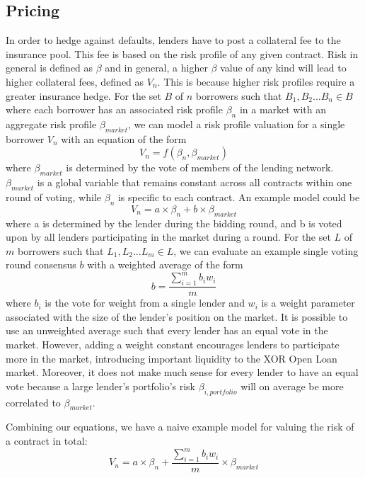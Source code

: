 \documentclass[twoside]{article}
\begin{document}
\subsection{Pricing}
In order to hedge against defaults, lenders have to post a collateral fee to the insurance pool. This fee is based on the risk profile of any given contract. Risk in general is defined as $\beta$ and in general, a higher $\beta$ value of any kind will lead to higher collateral fees, defined as $V_{n}$. This is because higher risk profiles require a greater insurance hedge. For the set $B$  of $n$ borrowers such that $B_{1}, B_{2}...B_{n} \in B$ where each borrower has an associated risk profile $\beta_{n}$ in a market with an aggregate risk profile $\beta_{market}$, we can model a risk profile valuation for a single borrower $V_{n}$ with an equation of the form
\begin{equation}
V_{n} = f(\beta_{n}, \beta_{market})
\end{equation}
where $\beta_{market}$ is determined by the vote of members of the lending network. $\beta_{market}$ is a global variable that remains constant across all contracts within one round of voting, while $\beta_{n}$ is specific to each contract. An example model could be
\begin{equation}
V_{n} = a\times \beta_{n} + b\times \beta_{market}
\end{equation}
where a is determined by the lender during the bidding round, and b is voted upon by all lenders participating in the market during a round. For the set $L$ of $m$ borrowers such that $L_{1}, L_{2}...L_{m} \in L$, we can evaluate an example single voting round consensus $b$ with a weighted average of the form
\begin{equation}
b = \frac{\sum\limits_{i=1}^m b_{i} w_{i}}{m}
\end{equation}
where $b_{i}$ is the vote for weight from a single lender and $w_{i}$ is a weight parameter associated with the size of the lender's position on the market. It is possible to use an unweighted average such that every lender has an equal vote in the market. However, adding a weight constant encourages lenders to participate more in the market, introducing important liquidity to the XOR Open Loan market. Moreover, it does not make much sense for every lender to have an equal vote because a large lender's portfolio's risk $\beta_{i,portfolio}$ will on average be more correlated to $\beta_{market}$. 

Combining our equations, we have a naive example model for valuing the risk of a contract in total: 
\begin{equation}
V_{n} = a\times \beta_{n} + \frac{\sum\limits_{i=1}^m b_{i} w_{i}}{m} \times \beta_{market}
\end{equation}
\end{document}
